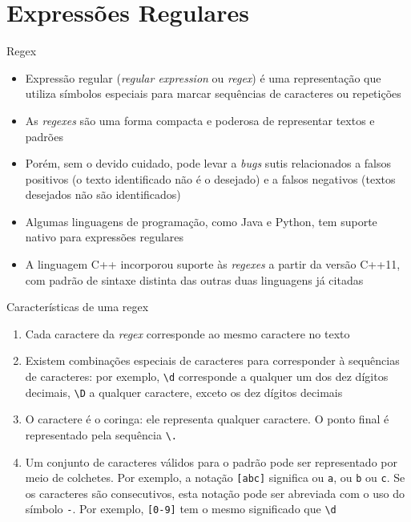 \section{Expressões Regulares}

\begin{frame}[fragile]{Regex}

    \begin{itemize}
        \item Expressão regular (\textit{regular expression} ou \textit{regex}) é uma 
            representação que utiliza símbolos especiais para marcar sequências de caracteres 
            ou repetições
        \pause

        \item As \textit{regexes} são uma forma compacta e poderosa de representar textos e padrões
        \pause

        \item Porém, sem o devido cuidado, pode levar a \textit{bugs} sutis relacionados a falsos 
            positivos (o texto identificado não é o desejado) e a falsos negativos 
            (textos desejados não são identificados)
        \pause

        \item Algumas linguagens de programação, como Java e Python, tem suporte nativo para 
            expressões regulares
        \pause

        \item A linguagem C++ incorporou suporte às \textit{regexes} a partir da versão C++11, 
            com padrão de sintaxe distinta das outras duas linguagens já citadas
    \end{itemize}

\end{frame}

\begin{frame}[fragile]{Características de uma regex}

    \begin{enumerate}
        \item Cada caractere da \textit{regex} corresponde ao mesmo caractere no texto
        \pause
        \item Existem combinações especiais de caracteres para corresponder à sequências de caracteres: por exemplo, \verb|\d| corresponde a qualquer um dos dez dígitos decimais, \verb|\D| a qualquer caractere, exceto os dez dígitos decimais
        \pause
        \item O caractere  é o coringa: ele representa qualquer caractere. O ponto final é representado pela sequência \verb|\.|
        \pause
        \item Um conjunto de caracteres válidos para o padrão pode ser representado por meio de colchetes. Por exemplo, a notação \verb|[abc]| significa ou \texttt{a}, ou \texttt{b} ou \texttt{c}. Se os caracteres são consecutivos, esta notação pode ser abreviada com o uso do símbolo \texttt{-}. Por exemplo, \verb|[0-9]| tem o mesmo significado que \verb|\d|
    \end{enumerate}

\end{frame}

